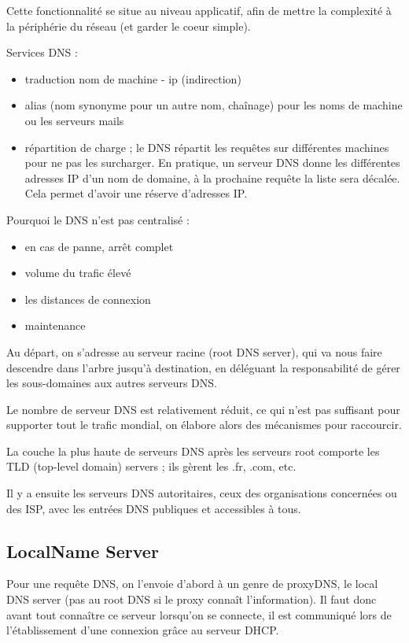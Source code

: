 Cette fonctionnalité se situe au niveau applicatif, afin de mettre la complexité à la périphérie du réseau (et garder le coeur simple).

Services DNS :

\begin{itemize}
	\item traduction nom de machine - ip (indirection)
	\item alias (nom synonyme pour un autre nom, chaînage) pour les noms de machine ou les serveurs mails
	\item répartition de charge ; le DNS répartit les requêtes sur différentes machines pour ne pas les surcharger. En pratique, un serveur DNS donne les différentes adresses IP d'un nom de domaine, à la prochaine requête la liste sera décalée. Cela permet d'avoir une réserve d'adresses IP.
\end{itemize}

Pourquoi le DNS n'est pas centralisé :

\begin{itemize}
	\item en cas de panne, arrêt complet
	\item volume du trafic élevé
	\item les distances de connexion
	\item maintenance
\end{itemize}


Au départ, on s'adresse au serveur racine (root DNS server), qui va nous faire descendre dans l'arbre jusqu'à destination, en déléguant la responsabilité de gérer les sous-domaines aux autres serveurs DNS.

Le nombre de serveur DNS est relativement réduit, ce qui n'est pas suffisant pour supporter tout le trafic mondial, on élabore alors des mécanismes pour raccourcir.

La couche la plus haute de serveurs DNS après les serveurs root comporte les TLD (top-level domain) servers  ; ils gèrent les .fr, .com, etc.

Il y a ensuite les serveurs DNS autoritaires, ceux des organisations concernées ou des ISP, avec les entrées DNS publiques et accessibles à tous.

	\subsection{LocalName Server}
	
	Pour une requête DNS, on l'envoie d'abord à un genre de proxyDNS, le local DNS server (pas au root DNS si le proxy connaît l'information). Il faut donc avant tout connaître ce serveur lorsqu'on se connecte, il est communiqué lors de l'établissement d'une connexion grâce au serveur DHCP.
	
